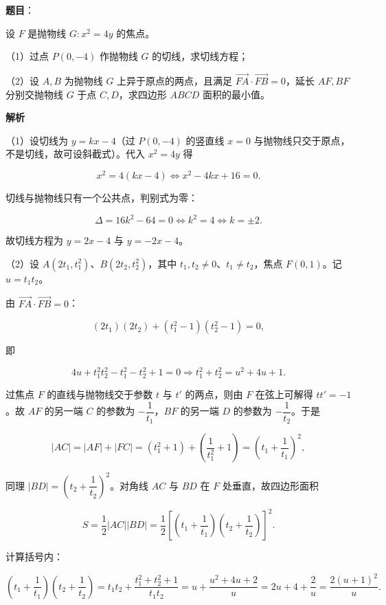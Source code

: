 \begin{answer}

\textbf{题目}：

设 $F$ 是抛物线 $G:x^2=4y$ 的焦点。

（1）过点 $P(0,-4)$ 作抛物线 $G$ 的切线，求切线方程；

（2）设 $A,B$ 为抛物线 $G$ 上异于原点的两点，且满足 $\overrightarrow{FA}\cdot\overrightarrow{FB}=0$，延长 $AF,BF$ 分别交抛物线 $G$ 于点 $C,D$，求四边形 $ABCD$ 面积的最小值。

\textbf{解析}

（1）设切线为 $y=kx-4$（过 $P(0,-4)$ 的竖直线 $x=0$ 与抛物线只交于原点，不是切线，故可设斜截式）。代入 $x^2=4y$ 得

\nopagebreak[4]
\[x^2=4(kx-4)\iff x^2-4kx+16=0.\]

切线与抛物线只有一个公共点，判别式为零：

\nopagebreak[4]
\[\Delta=16k^2-64=0\iff k^2=4\iff k=\pm2.\]

故切线方程为 $y=2x-4$ 与 $y=-2x-4$。

（2）设 $A(2t_1,t_1^2)$、$B(2t_2,t_2^2)$，其中 $t_1,t_2\neq0$、$t_1\neq t_2$，焦点 $F(0,1)$。记 $u=t_1t_2$。

由 $\overrightarrow{FA}\cdot\overrightarrow{FB}=0$：

\nopagebreak[4]
\[(2t_1)(2t_2)+(t_1^2-1)(t_2^2-1)=0,\]

即

\nopagebreak[4]
\[4u+t_1^2t_2^2-t_1^2-t_2^2+1=0\Longrightarrow t_1^2+t_2^2=u^2+4u+1.\]

过焦点 $F$ 的直线与抛物线交于参数 $t$ 与 $t'$ 的两点，则由 $F$ 在弦上可解得 $tt'=-1$。故 $AF$ 的另一端 $C$ 的参数为 $-\dfrac1{t_1}$，$BF$ 的另一端 $D$ 的参数为 $-\dfrac1{t_2}$。于是

\nopagebreak[4]
\[|AC|=|AF|+|FC|=(t_1^2+1)+\left(\frac1{t_1^2}+1\right)=\left(t_1+\frac1{t_1}\right)^2,\]

同理 $|BD|=\left(t_2+\dfrac1{t_2}\right)^2$。对角线 $AC$ 与 $BD$ 在 $F$ 处垂直，故四边形面积

\nopagebreak[4]
\[S=\frac12|AC||BD|=\frac12\left[\left(t_1+\frac1{t_1}\right)\left(t_2+\frac1{t_2}\right)\right]^2.\]

计算括号内：

\nopagebreak[4]
\[\left(t_1+\frac1{t_1}\right)\left(t_2+\frac1{t_2}\right)=t_1t_2+\frac{t_1^2+t_2^2+1}{t_1t_2}=u+\frac{u^2+4u+2}{u}=2u+4+\frac2u=\frac{2(u+1)^2}{u}.\]


\end{answer}
